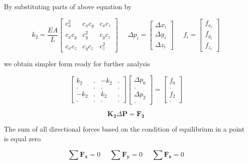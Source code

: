 By substituting parts of above equation by

\begin{equation}
k_2 = \frac {EA} L
\begin{bmatrix}
	c^2_x & c_xc_y & c_xc_z \\
	c_xc_y & c^2_y & c_yc_z \\
	c_xc_z & c_yc_z & c^2_z
\end{bmatrix}
\;\;\;\;\;
\Delta p_i =
\begin{bmatrix}
	\Delta x_i \\
	\Delta y_i \\
	\Delta z_i
\end{bmatrix}
\;\;\;\;\;
f_i =
\begin{bmatrix}
	f_{x_i} \\
	f_{y_i} \\
	f_{z_i}
\end{bmatrix}
\end{equation}

we obtain simpler form ready for further analysis

\begin{equation}
\begin{bmatrix}
	k_2 & . & -k_2 & . \\
	. & . & . & . \\
	-k_2 & . & k_2 & . \\
	. & . & . & .
\end{bmatrix}
\begin{bmatrix}
	\Delta p_0 \\
	. \\
	\Delta p_2 \\
	.
\end{bmatrix}
=
\begin{bmatrix}
	f_0 \\
	. \\
	f_2 \\
	.
\end{bmatrix}
\end{equation}

\begin{equation}
\mathbf{K_2} \Delta \mathbf{P} = \mathbf{F_2}
\end{equation}

The sum of all directional forces based on the condition of equilibrium in a point is equal zero

\begin{equation}
\sum \mathbf{F_x} = 0\;\;\;\;\;\sum \mathbf{F_y} = 0\;\;\;\;\;\sum \mathbf{F_z} = 0
\end{equation}

